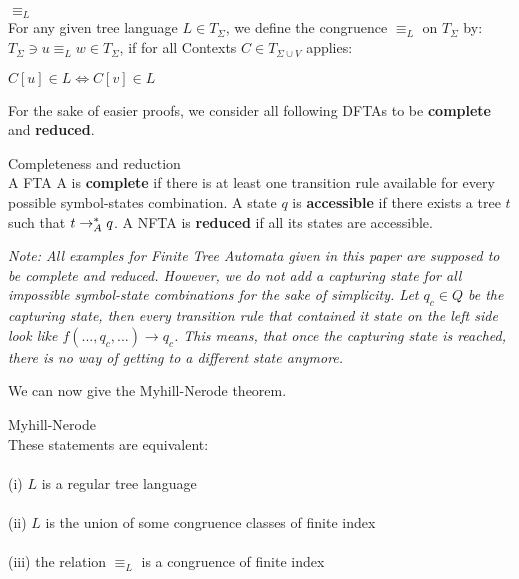 \documentclass{llncs}
\begin{document}
\begin{definition}{\(\equiv_L\)} \cite{tata-nfta} \\
	For any given tree language \(L \in T_\Sigma\), we define the congruence \(\equiv_L\) on \(T_\Sigma\) by: \(T_\Sigma \ni u \equiv_L w \in T_\Sigma\), if for all Contexts \(C \in T_{\Sigma \cup V}\) applies:
	\begin{center}
		\(C[u] \in L \iff C[v] \in L\)
	\end{center}
\end{definition}

For the sake of easier proofs, we consider all following DFTAs to be \textbf{complete} and \textbf{reduced}.

\begin{definition}{Completeness and reduction} \cite{wiki-tree-automaton}\\
A FTA A is \textbf{complete} if there is at least one transition rule available for every possible symbol-states combination. A state \(q\) is \textbf{accessible} if there exists a tree \(t\) such that \(t \rightarrow_A^* q\). A NFTA is \textbf{reduced} if all its states are accessible.
\end{definition}

\textit{Note: All examples for Finite Tree Automata given in this paper are supposed to be complete and reduced. However, we do not add a capturing state for all impossible symbol-state combinations for the sake of simplicity. Let \(q_c \in Q\) be the capturing state, then every transition rule that contained it state on the left side look like \(f(..., q_c, ...) \rightarrow q_c\). This means, that once the capturing state is reached, there is no way of getting to a different state anymore.}

We can now give the Myhill-Nerode theorem.

\begin{theorem}{Myhill-Nerode} \cite{tata-nfta}\\
	These statements are equivalent:\\\\
	(i) \(L\) is a regular tree language\\\\
	(ii) \(L\) is the union of some congruence classes of finite index\\\\
	(iii) the relation \(\equiv_L\) is a congruence of finite index
\end{theorem}
\end{document}
